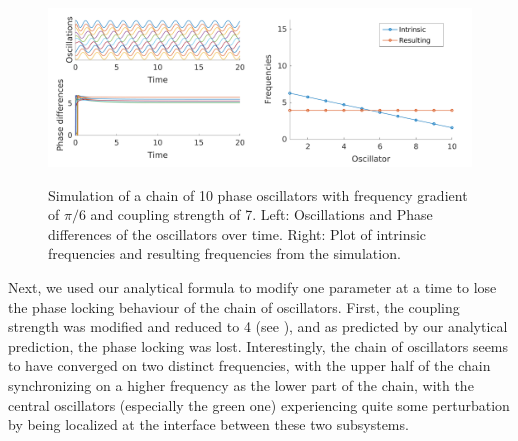 \documentclass[a4paper]{scrartcl}
\begin{document}
\begin{figure}[!h]
	\centering
	\includegraphics[width=0.5\textwidth]{fig/chain_phase_oscil-6a_stable.png}\includegraphics[width=0.5\textwidth]{fig/chain_phase_oscil_freq-6a_stable.png}
	\caption{Simulation of a chain of 10 phase oscillators with frequency gradient of $\pi /6$ and coupling strength of 7. Left: Oscillations and Phase differences of the oscillators over time.  Right: Plot of intrinsic frequencies and resulting frequencies from the simulation.}
\end{figure}

Next, we used our analytical formula to modify one parameter at a time to lose the phase locking behaviour of the chain of oscillators. First, the coupling strength was modified and reduced to 4 (see \cite{6aunstablecoupling}), and as predicted by our analytical prediction, the phase locking was lost. Interestingly, the chain of oscillators seems to have converged on two distinct frequencies, with the upper half of the chain synchronizing on a higher frequency as the lower part of the chain, with the central oscillators (especially the green one) experiencing quite some perturbation by being localized at the interface between these two subsystems.
\end{document}
